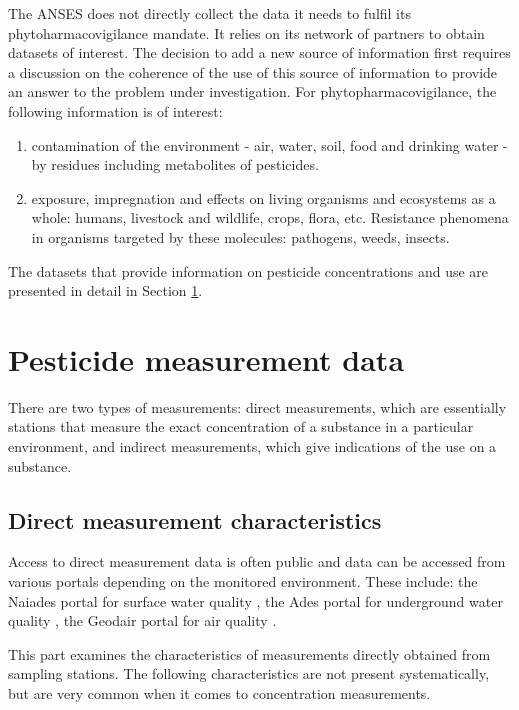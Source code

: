 The ANSES does not directly collect the data it needs to fulfil its phytoharmacovigilance mandate. It relies on its network of partners to obtain datasets of interest. The decision to add a new source of information first requires a discussion on the coherence of the use of this source of information to provide an answer to the problem under investigation. For phytopharmacovigilance, the following information is of interest: 
\begin{enumerate}
\item contamination of the environment - air, water, soil, food and drinking water - by residues including metabolites of pesticides.
\item exposure, impregnation and effects on living organisms and ecosystems as a whole: humans, livestock and wildlife, crops, flora, etc. Resistance phenomena in organisms targeted by these molecules: pathogens, weeds, insects.
\end{enumerate}
The datasets that provide information on pesticide concentrations and use are presented in detail in Section \ref{chp:2:3}.

\section{Pesticide measurement data}\label{chp:2:3}

There are two types of measurements: direct measurements, which are essentially stations that measure the exact concentration of a substance in a particular environment, and indirect measurements, which give indications of the use on a substance.

\subsection{Direct measurement characteristics}

Access to direct measurement data is often public and data can be accessed from various portals depending on the monitored environment. These include: the Naiades portal for surface water quality \citep{Naiade2}, the Ades portal for underground water quality \citep{Ades}, the Geodair portal for air quality \citep{Geodair}.
 
This part examines the characteristics of measurements directly obtained from sampling stations. The following characteristics are not present systematically, but are very common when it comes to concentration measurements.

